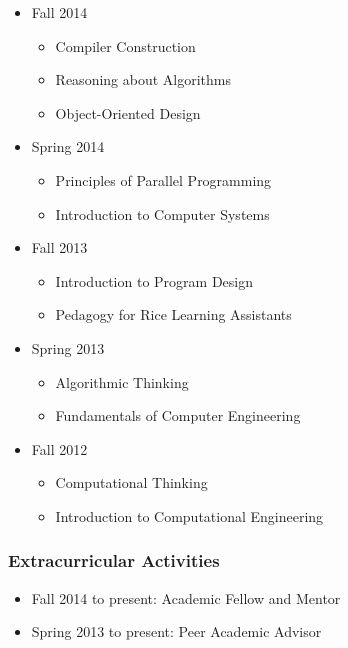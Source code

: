 \documentclass[12pt]{article}
\begin{document}
\begin{itemize}

    \item{Fall 2014}
    \begin{itemize}
        \item{Compiler Construction}
        \item{Reasoning about Algorithms}
        \item{Object-Oriented Design}
    \end{itemize}

    \item{Spring 2014}
    \begin{itemize}
        \item{Principles of Parallel Programming}
        \item{Introduction to Computer Systems}
    \end{itemize}

    \item{Fall 2013}
    \begin{itemize}
        \item{Introduction to Program Design}
        \item{Pedagogy for Rice Learning Assistants}
    \end{itemize}

    \item{Spring 2013}
    \begin{itemize}
        \item{Algorithmic Thinking}
        \item{Fundamentals of Computer Engineering}
    \end{itemize}

    \item{Fall 2012}
    \begin{itemize}
        \item{Computational Thinking}
        \item{Introduction to Computational Engineering}
    \end{itemize}

\end{itemize}





\subsubsection{Extracurricular Activities}

\begin{itemize}
    \item{Fall 2014 to present: Academic Fellow and Mentor}
    \item{Spring 2013 to present: Peer Academic Advisor}
\end{itemize}
\end{document}
